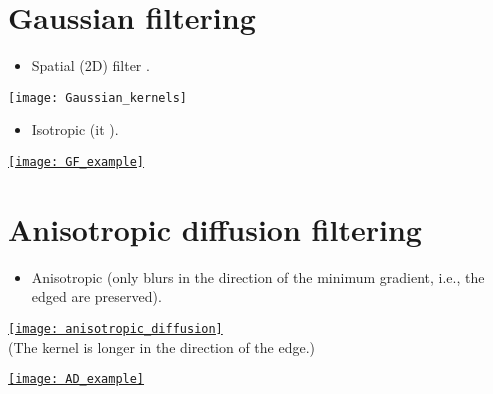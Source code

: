\section{Gaussian filtering}
\begin{itemize}
\item Spatial (2D) filter  .
\end{itemize}
\vspace{-4ex}
\begin{center}
  \texttt{[image: Gaussian\_kernels]}
\end{center}
\vspace{-4ex}
\begin{itemize}
\item Isotropic (it ).
\end{itemize}
\begin{center}
    \href{https://www.cloudfactory.com/blog/gaussian-noise-medical-ai}{\texttt{[image: GF\_example]}}
\end{center}

\section{Anisotropic diffusion filtering}
\begin{itemize}
\item Anisotropic (only blurs in the direction of the minimum
  gradient, i.e., the edged are preserved).
\end{itemize}
\begin{center}
  \href{https://dsp.stackexchange.com/questions/14606/anisotropic-diffusion}{\texttt{[image: anisotropic\_diffusion]}}\\
  (The kernel is longer in the direction of the edge.)
\end{center}
\begin{center}
    \href{https://es.mathworks.com/help/images/ref/imdiffusefilt.html}{\texttt{[image: AD\_example]}}
\end{center}

